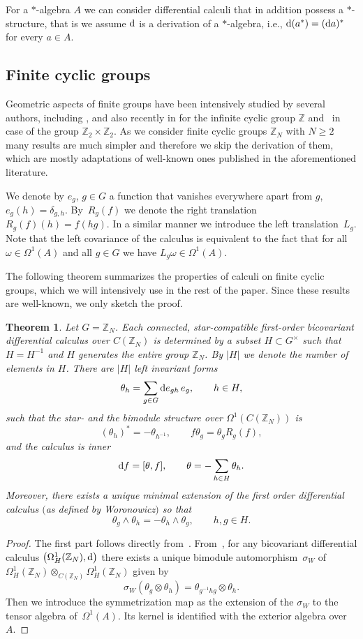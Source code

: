 \documentclass[pdftex]{sigma}
\numberwithin{equation}{section}
\newtheorem{Theorem}{Theorem}[section]
\newcommand{\Z}{\mathbb{Z}}
\begin{document}
For a $\ast$-algebra $A$ we can consider differential calculi that in addition possess a $\ast$-structure, that is we assume ${\rm d}$ is a derivation of a $\ast$-algebra, i.e., ${\rm d}(a^\ast)=({\rm d}a)^\ast$ for every $a\in A$.

\subsection{Finite cyclic groups}

Geometric aspects of finite groups have been intensively studied by several authors, including \cite{BHDS,DMH}, and also
recently in \cite{M1} for the infinite cyclic group $\mathbb{Z}$ and~\cite{M2} in case of the
group $\mathbb{Z}_2\times\mathbb{Z}_2$.
As we consider finite cyclic groups $\mathbb{Z}_N$ with $N\ge 2$ many results are much simpler and therefore we skip the derivation of them, which are mostly adaptations of well-known ones published in the aforementioned literature.

We denote by $e_g$, $g\in G$ a function that vanishes everywhere apart from $g$, $e_g(h) =\delta_{g,h}$.
By~$R_g(f)$ we denote the right translation $R_g(f)(h) = f(hg).$ In a similar manner we introduce the left translation~$L_g$. Note that the left covariance of the calculus is equivalent to the fact that for all $\omega\in \Omega^1(A)$ and
all $g\in G$ we have $L_g\omega\in \Omega^1(A)$.

 The following theorem summarizes the properties of calculi on finite cyclic groups, which we will intensively use in the rest
of the paper. Since these results are well-known, we only sketch the proof.

\begin{Theorem}
Let $G=\Z_N$. Each connected, star-compatible first-order
bicovariant differential calculus over $C(\Z_N)$ is determined by a subset
$H \subset G^\times$ such that $H = H^{-1}$ and $H$ generates the entire group $\Z_N$. By $|H|$ we denote the number of elements in $H$. There are $|H|$ left invariant forms
\[ \theta_h=\sum\limits_{g\in G}{\rm d}e_{gh}\, e_g, \qquad h \in H, \]
such that the star- and the bimodule structure over $\Omega^1(C(\Z_N))$ is
\[ (\theta_h)^* = - \theta_{h^{-1}}, \qquad f \theta_g = \theta_g R_g(f), \]
and the calculus is inner
\[ {\rm d} f = [\theta, f], \qquad \theta = -\sum\limits_{h \in H} \theta_h. \]
Moreover, there exists a unique minimal extension of the first order differential calculus
$($as defined by Woronowicz$)$ so that
\[ \theta_g \wedge \theta_h = - \theta_h \wedge \theta_g, \qquad h,g \in H. \]
\end{Theorem}
\begin{proof}
The first part follows directly from~\cite[Section~2]{DMH}. From~\cite[Proposition 3.1]{Wo89}, for any bicovariant differential calculus $\big(\Omega^1_H(\mathbb{Z}_N),{\rm d}\big)$ there exists a unique bimodule automorphism~$\sigma_W$ of $\Omega^1_H(\mathbb{Z}_N)\otimes_{C(\mathbb{Z}_N)} \Omega^1_H(\mathbb{Z}_N)$ given by
\[ \sigma_W(\theta_g\otimes\theta_h)=\theta_{g^{-1}hg}\otimes\theta_h.\]
Then we introduce the symmetrization map as the extension of the $\sigma_W$ to the tensor algebra of~$\Omega^1(A)$. Its
kernel is identified with the exterior algebra over~$A$.
\end{proof}
\end{document}
